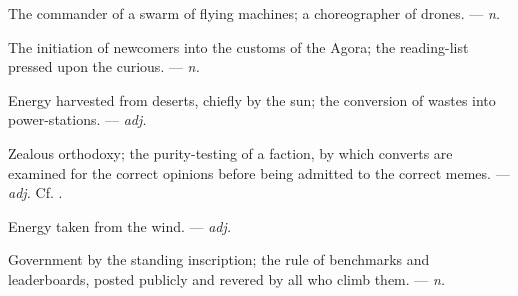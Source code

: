  The commander of a swarm of flying machines; a choreographer of drones. ---  \textit{n.}

 The initiation of newcomers into the customs of the Agora; the reading-list pressed upon the curious. ---  \textit{n.}

 Energy harvested from deserts, chiefly by the sun; the conversion of wastes into power-stations. ---  \textit{adj.}

 Zealous orthodoxy; the purity-testing of a faction, by which converts are examined for the correct opinions before being admitted to the correct memes. ---  \textit{adj.} Cf. .

 Energy taken from the wind. ---  \textit{adj.}

 Government by the standing inscription; the rule of benchmarks and leaderboards, posted publicly and revered by all who climb them. ---  \textit{n.}
